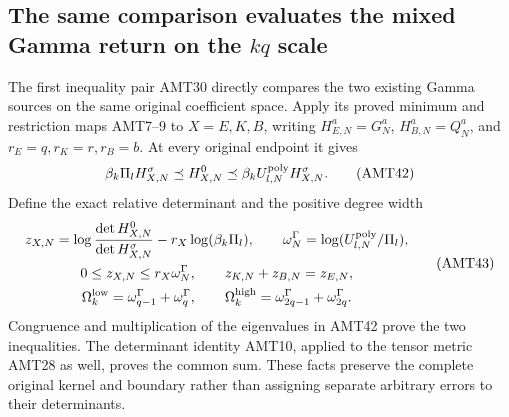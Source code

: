 \documentclass[11pt,a4paper]{article}
\begin{document}
\subsection{The same comparison evaluates the mixed Gamma return on the $kq$ scale}
The first inequality pair AMT30 directly compares the two existing
Gamma sources on the same original coefficient space. Apply its
proved minimum and restriction maps AMT7--9 to $X=E,K,B$, writing
$H_{E,N}^a=G_N^a$, $H_{B,N}^a=Q_N^a$, and
$r_E=q,r_K=r,r_B=b$. At every original endpoint it gives
\[
 \beta_k\Pi_l H_{X,N}^\sigma\preceq H_{X,N}^0
       \preceq\beta_k U_{l,N}^{\rm poly}H_{X,N}^\sigma.
 \tag{AMT42}
\]
Define the exact relative determinant and the positive degree width
\[
\begin{gathered}
 z_{X,N}=\log\frac{\det H_{X,N}^0}{\det H_{X,N}^\sigma}
                              -r_X\log(\beta_k\Pi_l),\qquad
 \omega_N^\Gamma=\log(U_{l,N}^{\rm poly}/\Pi_l),\\
 0\le z_{X,N}\le r_X\omega_N^\Gamma,\qquad
 z_{K,N}+z_{B,N}=z_{E,N},\\
 \Omega_k^{\rm low}=\omega_{q-1}^\Gamma+\omega_q^\Gamma,\qquad
 \Omega_k^{\rm high}=\omega_{2q-1}^\Gamma+\omega_{2q}^\Gamma.
\end{gathered}\tag{AMT43}
\]
Congruence and multiplication of the eigenvalues in AMT42 prove
the two inequalities. The determinant identity AMT10, applied to
the tensor metric AMT28 as well, proves the common sum. These
facts preserve the complete original kernel and boundary rather
than assigning separate arbitrary errors to their determinants.
\end{document}
